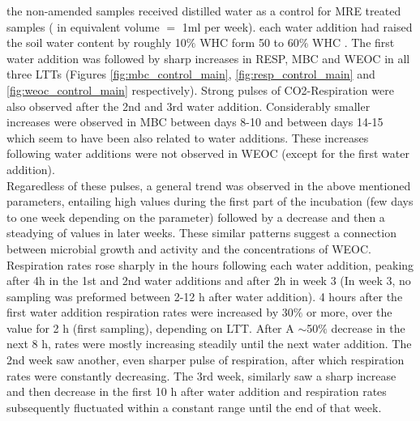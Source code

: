 \documentclass[12pt]{report}
\begin{document}
		the non-amended samples received distilled water as a control for MRE treated samples ( in equivalent volume $=$ 1ml per week).
		each water addition had raised the soil water content by roughly 10$\%$ WHC form 50 to 60$\%$ WHC .
		The first water addition was followed by sharp increases in RESP, MBC and  WEOC in all three LTTs (Figures \ref{fig:mbc_control_main}, \ref{fig:resp_control_main} and \ref{fig:weoc_control_main} respectively). Strong pulses of CO2-Respiration were also observed after the 2nd and 3rd water addition. Considerably smaller increases were observed in MBC between days 8-10 and between days 14-15 which seem to have been also related to water additions. These increases following water additions were not observed in WEOC (except for the first water addition). \\
		Regaredless of these pulses, a general trend was observed in the above mentioned parameters, entailing high values during the first part of the incubation (few days to one week depending on the parameter) followed by a decrease and then a steadying of values in later weeks. These similar patterns suggest a connection between microbial growth and activity and the concentrations of WEOC. \\
		Respiration rates rose sharply in the hours following each water addition, peaking after 4h in the 1st and 2nd water additions and after 2h in week 3 (In week 3, no sampling was preformed between 2-12 h after water addition). 4 hours after the first water addition respiration rates were increased by 30$\%$ or more, over the value for 2 h (first sampling), depending on LTT. After A $ \sim $50$\%$ decrease in the next 8 h, rates were mostly  increasing  steadily until the next water addition. The 2nd week saw another, even sharper pulse of respiration, after which respiration rates were constantly decreasing. The 3rd week, similarly saw a sharp increase and then decrease in the first 10 h after water addition and respiration rates subsequently fluctuated within a constant range until the end of that week.\\
		
\end{document}
